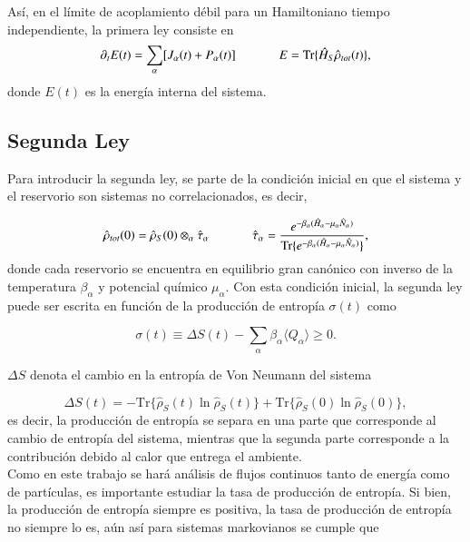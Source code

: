 Así, en el límite de acoplamiento débil para un Hamiltoniano tiempo independiente, la primera ley consiste en 
\begin{equation*}
    \partial_{t}E(t) = \sum_{\alpha}[J_{\alpha}(t) + P_{\alpha}(t) ] \hspace{12mm} E = \text{Tr}\{\hat{H}_{S}\hat{\rho}_{tot}(t) \},
\end{equation*}
donde $E(t)$ es la energía interna del sistema.


\subsection{Segunda Ley}
Para introducir la segunda ley, se parte de la condición inicial en que el sistema y el reservorio son sistemas no correlacionados, es decir, 

\begin{equation*}
    \hat{\rho}_{tot}(0) = \hat{\rho}_{S}(0)\otimes_{\alpha}\hat{\tau}_{\alpha} \hspace{12mm} \hat{\tau}_{\alpha} = \frac{e^{-\beta_{\alpha}(\hat{H}_{\alpha}-\mu_{\alpha}\hat{N}_{\alpha}) }}{ \text{Tr}\{e^{-\beta_{\alpha}(\hat{H}_{\alpha} - \mu_{\alpha}\hat{N}_{\alpha})}\} },
\end{equation*}
donde cada reservorio se encuentra en equilibrio gran canónico con inverso de la temperatura $\beta_{\alpha}$ y potencial químico $\mu_{\alpha}$. Con esta condición inicial, la segunda ley puede ser escrita en función de la producción de entropía $\sigma(t)$ como \cite{esposito2010entropy}

\begin{equation*}
    \sigma(t) \equiv \Delta S(t) - \sum_{\alpha}\beta_{\alpha}\langle Q_{\alpha}\rangle \geq 0.
\end{equation*}

$\Delta S$ denota el cambio en la entropía de Von Neumann del sistema

\begin{equation*}
    \Delta S(t) = -  \text{Tr}\{\hat{\rho}_{S}(t)\ln \hat{\rho}_{S}(t) \} +  \text{Tr}\{ \hat{\rho}_{S}(0)\ln \hat{\rho}_{S}(0) \},
\end{equation*}
es decir, la producción de entropía se separa en una parte que corresponde al cambio de entropía del sistema, mientras que la segunda parte corresponde a la contribución debido al calor que entrega el ambiente.\\
Como en este trabajo se hará análisis de flujos continuos tanto de energía como de partículas, es importante estudiar la tasa de producción de entropía. Si bien, la producción de entropía siempre es positiva, la tasa de producción de entropía no siempre lo es, aún así para sistemas markovianos se cumple que \cite{strasberg2019non}

